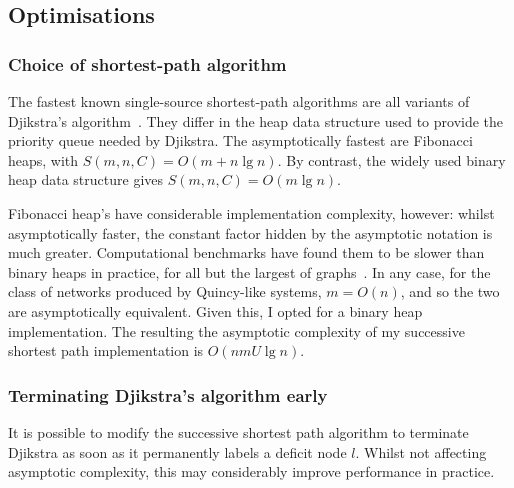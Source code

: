 
\subsection{Optimisations}


\subsubsection{Choice of shortest-path algorithm}
The fastest known single-source shortest-path algorithms are all variants of Djikstra's algorithm~\cite[ch.~4]{Ahuja:1993}. They differ in the heap data structure used to provide the priority queue needed by Djikstra. The asymptotically fastest are Fibonacci heaps, with $S(m,n,C) = O(m + n\lg n)$. By contrast, the widely used binary heap data structure gives $S(m,n,C) = O(m\lg n)$. 

Fibonacci heap's have considerable implementation complexity, however: whilst asymptotically faster, the constant factor hidden by the asymptotic notation is much greater. Computational benchmarks have found them to be slower than binary heaps in practice, for all but the largest of graphs~\cite[p.~15]{KiralyKovacs:2012}. In any case, for the class of networks produced by Quincy-like systems, $m = O(n)$, and so the two are asymptotically equivalent. Given this, I opted for a binary heap implementation. The resulting the asymptotic complexity of my successive shortest path implementation is $O(nmU \lg n)$.

\subsubsection{Terminating Djikstra's algorithm early}

It is possible to modify the successive shortest path algorithm to terminate Djikstra as soon as it permanently labels a deficit node $l$. Whilst not affecting asymptotic complexity, this may considerably improve performance in practice.\\

